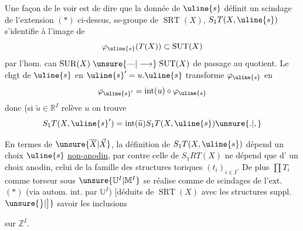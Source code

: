 
Une façon de le voir est de dire que
la donnée de $\uline{s}$ définit un scindage
 de
l'extension $(*)$ ci-dessus, 
ss-groupe de $\operatorname{SRT}(X)$,
$S_1T(X,\uline{s})$ s'identifie
à l'image  de
\[
\varphi_{\uline{s}}(T(X))\subset\operatorname{SUT}(X)
\]
par l'hom. can
$\operatorname{SUR}(X)\mathrel{\unsure{\text{---}|\longrightarrow}}\operatorname{SUT}(X)$
de passage au quotient. Le chgt de
$\uline{s}$ en $\uline{s}'=u.\uline{s}$
transforme $\varphi_{\uline{s}}$ en
\[
\varphi_{\uline{s}'}=\operatorname{int}(u)\circ\varphi_{\uline{s}}
\]
donc (si $\widetilde u\in\mathbb R^I$ relève $u$\unsure{,|)} on trouve
\[
S_1T(X,\uline{s}')
=\operatorname{int}(\widetilde u)S_1T(X,\uline{s})\unsure{.|,}
\]

En termes de $\unsure{\overline X|\vec X}$, la définition de
$S_1T(X,\uline{s})$
dépend un choix $\uline{s}$ \uline{non-anodin},
par contre celle de $S_1RT(X)$ ne dépend que d'
un choix anodin, celui de la famille des
structures toriques $(t_i)_{i\in I}$.
De plus $\prod T_i$ comme
torseur sous $\unsure{\mathbb U^I|\mathbb M^I}$ se réalise
comme  de scindages de l'ext. $(*)$
(via autom. int. par $\mathbb U^I$)
$\bigl[$déduits de $\operatorname{SRT}(X)$
avec les structures suppl.$\unsure{\bigr\}|\bigr]}$
savoir\unsure{)|,} les inclusions


 sur $\mathbb Z^I$.

